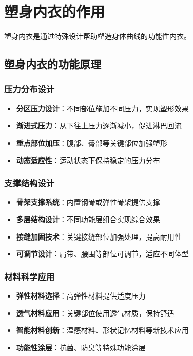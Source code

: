 \documentclass[12pt,UTF8]{ctexbook}
\begin{document}
\section{塑身内衣的作用}
塑身内衣是通过特殊设计帮助塑造身体曲线的功能性内衣。

\subsection{塑身内衣的功能原理}
\subsubsection{压力分布设计}
\begin{itemize}[leftmargin=2cm]
	\item \textbf{分区压力设计}：不同部位施加不同压力，实现塑形效果
	\item \textbf{渐进式压力}：从下往上压力逐渐减小，促进淋巴回流
	\item \textbf{重点部位加压}：腹部、臀部等关键部位加强塑形
	\item \textbf{动态适应性}：运动状态下保持稳定的压力分布
\end{itemize}

\subsubsection{支撑结构设计}
\begin{itemize}[leftmargin=2cm]
	\item \textbf{骨架支撑系统}：内置钢骨或弹性骨架提供支撑
	\item \textbf{多层结构设计}：不同功能层组合实现综合效果
	\item \textbf{接缝加固技术}：关键接缝部位加强处理，提高耐用性
	\item \textbf{可调节设计}：肩带、腰围等部位可调节，适应不同体型
\end{itemize}

\subsubsection{材料科学应用}
\begin{itemize}[leftmargin=2cm]
	\item \textbf{弹性材料选择}：高弹性材料提供适度压力
	\item \textbf{透气材料应用}：关键部位使用透气材质，保持舒适
	\item \textbf{智能材料创新}：温感材料、形状记忆材料等新技术应用
	\item \textbf{功能性涂层}：抗菌、防臭等特殊功能涂层
\end{itemize}
\end{document}
